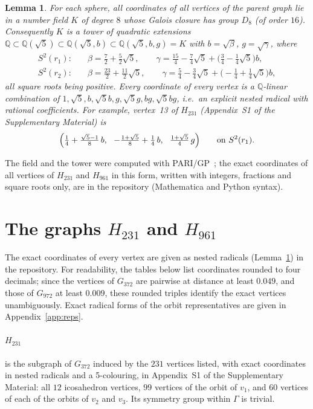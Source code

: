 \documentclass[11pt]{article}
\newtheorem{lemma}[theorem]{Lemma}
\theoremstyle{remark}
\begin{document}
\begin{lemma}\label{rem:field}
For each sphere, all coordinates of all vertices of the parent graph lie in a number field $K$ of degree
$8$ whose Galois closure has group $D_8$ (of order $16$). Consequently $K$ is a tower of quadratic
extensions $\mathbb{Q}\subset\mathbb{Q}(\sqrt5)\subset\mathbb{Q}(\sqrt5,b)\subset\mathbb{Q}(\sqrt5,b,g)=K$
with $b=\sqrt\beta$, $g=\sqrt\gamma$, where
\begin{align*}
S^2(r_1):\quad & \beta=\tfrac72+\tfrac52\sqrt5,\qquad
\gamma=\tfrac{15}{4}-\tfrac74\sqrt5+\bigl(\tfrac34-\tfrac14\sqrt5\bigr)b,\\
S^2(r_2):\quad & \beta=\tfrac{23}{2}+\tfrac{11}{2}\sqrt5,\qquad
\gamma=\tfrac54-\tfrac34\sqrt5+\bigl(-\tfrac14+\tfrac14\sqrt5\bigr)b,
\end{align*}
all square roots being positive. Every coordinate of every vertex is a $\mathbb{Q}$-linear combination of
$1,\sqrt5,b,\sqrt5 b,g,\sqrt5 g,bg,\sqrt5 bg$, i.e.\ an explicit nested radical with rational
coefficients. For example, vertex~13 of $H_{231}$ (Appendix~S1 of the Supplementary Material) is
\[
\Bigl(\tfrac14+\tfrac{\sqrt5-1}{8}\,b,\ \ -\tfrac{1+\sqrt5}{8}+\tfrac14\,b,\ \ \tfrac{1+\sqrt5}{4}\,g\Bigr)
\qquad\text{on }S^2(r_1).
\]
\end{lemma}
The field and the tower were computed with PARI/GP~\cite{PARI}; the exact coordinates of all vertices of
$H_{231}$ and $H_{961}$ in this form, written with integers, fractions and square roots only, are in the
repository (Mathematica and Python syntax).

\section{The graphs $H_{231}$ and $H_{961}$}\label{sec:graphs}

The exact coordinates of every vertex are given as nested radicals (Lemma~\ref{rem:field}) in the
repository. For readability, the tables below list coordinates rounded to four decimals; since
the vertices of $G_{372}$ are pairwise at distance at least $0.049$, and those of $G_{972}$ at least
$0.009$, these rounded triples identify the exact vertices unambiguously. Exact radical forms of the orbit representatives are given in Appendix~\ref{app:reps}.

\paragraph{$H_{231}$} is the subgraph of $G_{372}$ induced by the $231$ vertices listed, with exact coordinates in nested radicals and a
5-colouring, in Appendix~S1 of the Supplementary Material: all $12$ icosahedron vertices, $99$ vertices of the orbit of $v_1$, and $60$
vertices of each of the orbits of $v_2$ and $v_3$. Its symmetry group within $\Gamma$ is trivial.
\end{document}
